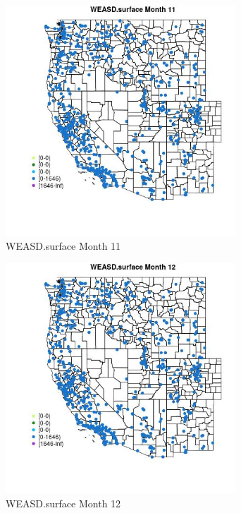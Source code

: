 \begin{figure} 
\centering  
\includegraphics[width=0.77\textwidth]{Code_Outputs/Report_ML_input_PM25_Step4_part_f_de_duplicated_aves_prioritize_24hr_obswNAs_MapObsMo11WEASDsurface.jpg} 
\caption{\label{fig:Report_ML_input_PM25_Step4_part_f_de_duplicated_aves_prioritize_24hr_obswNAsMapObsMo11WEASDsurface}WEASD.surface Month 11} 
\end{figure} 
 

\begin{figure} 
\centering  
\includegraphics[width=0.77\textwidth]{Code_Outputs/Report_ML_input_PM25_Step4_part_f_de_duplicated_aves_prioritize_24hr_obswNAs_MapObsMo12WEASDsurface.jpg} 
\caption{\label{fig:Report_ML_input_PM25_Step4_part_f_de_duplicated_aves_prioritize_24hr_obswNAsMapObsMo12WEASDsurface}WEASD.surface Month 12} 
\end{figure} 
 

